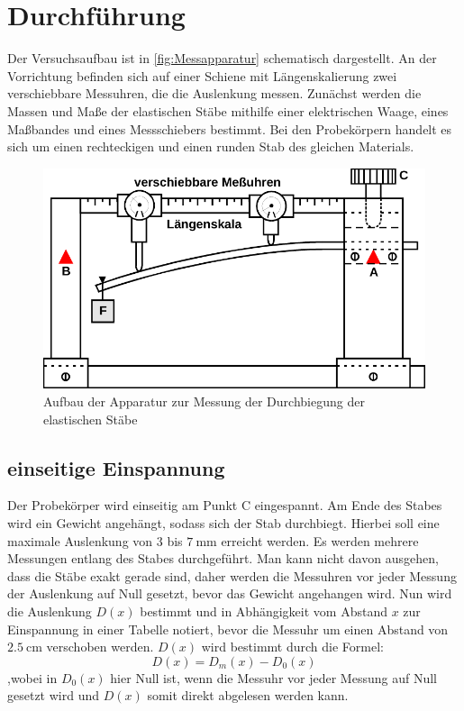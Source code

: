 \section{Durchführung}
\label{sec:Durchführung}

Der Versuchsaufbau ist in \autoref{fig:Messapparatur} schematisch dargestellt.
An der Vorrichtung befinden sich auf einer Schiene mit Längenskalierung zwei verschiebbare Messuhren, die die Auslenkung messen.
Zunächst werden die Massen und Maße der elastischen Stäbe mithilfe einer elektrischen Waage, eines Maßbandes und eines Messschiebers bestimmt.
Bei den Probekörpern handelt es sich um einen rechteckigen und einen runden Stab des gleichen Materials. 


\begin{figure}
    \centering
    \includegraphics{content/Messapparat.pdf}
    \caption{Aufbau der Apparatur zur Messung der Durchbiegung der elastischen Stäbe\cite[111]{V103}}
    \label{fig:Messapparatur}
\end{figure}

\subsection{einseitige Einspannung}
Der Probekörper wird einseitig am Punkt C eingespannt. 
Am Ende des Stabes wird ein Gewicht angehängt, sodass sich der Stab durchbiegt. 
Hierbei soll eine maximale Auslenkung von $\num{3}$ bis $\qty{7}{\milli\meter}$ erreicht werden.
Es werden mehrere Messungen entlang des Stabes durchgeführt.
Man kann nicht davon ausgehen, dass die Stäbe exakt gerade sind, daher werden die Messuhren vor jeder Messung der Auslenkung auf Null gesetzt,
bevor das Gewicht angehangen wird.
Nun wird die Auslenkung $D(x)$ bestimmt und in Abhängigkeit vom Abstand $x$ zur Einspannung in einer Tabelle notiert, 
bevor die Messuhr um einen Abstand von $\qty{2,5}{\centi\meter}$ verschoben werden.
$D(x)$ wird bestimmt durch die Formel:
\begin{equation}
    D(x) = D_m(x) - D_0(x)
    \label{eqn:D(x)1}
\end{equation}
,wobei in $D_0(x)$ hier Null ist, wenn die Messuhr vor jeder Messung auf Null gesetzt wird und $D(x)$ somit direkt abgelesen werden kann.

